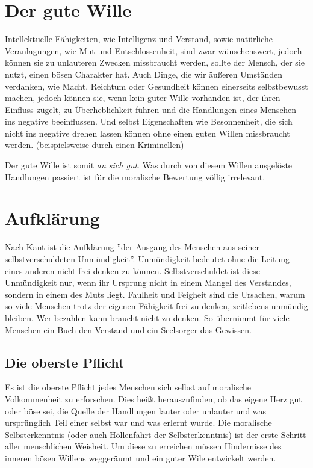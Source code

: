 \documentclass{article}
\begin{document}
\section*{Der gute Wille}
Intellektuelle Fähigkeiten, wie Intelligenz und Verstand, sowie natürliche Veranlagungen, wie Mut und Entschlossenheit,
sind zwar wünschenswert, jedoch können sie zu unlauteren Zwecken missbraucht werden, sollte der Mensch, der sie nutzt,
einen bösen Charakter hat. Auch Dinge, die wir äußeren Umständen verdanken, wie Macht, Reichtum oder Gesundheit können 
einerseits selbstbewusst machen, jedoch können sie, wenn kein guter Wille vorhanden ist, der ihren Einfluss zügelt, zu
Überheblichkeit führen und die Handlungen eines Menschen ins negative beeinflussen. Und selbst Eigenschaften wie Besonnenheit,
die sich nicht ins negative drehen lassen können ohne einen guten Willen missbraucht werden. (beispielsweise durch einen
Kriminellen)

Der gute Wille ist somit \emph{an sich gut}. Was durch von diesem Willen ausgelöste Handlungen passiert ist für die moralische 
Bewertung völlig irrelevant.

\section*{Aufklärung}
Nach Kant ist die Aufklärung ''der Ausgang des Menschen aus seiner selbstverschuldeten Unmündigkeit''. Unmündigkeit bedeutet
ohne die Leitung eines anderen nicht frei denken zu können. Selbstverschuldet ist diese Unmündigkeit nur, wenn ihr Ursprung
nicht in einem Mangel des Verstandes, sondern in einem des Muts liegt. Faulheit und Feigheit sind die Ursachen, warum so viele
Menschen trotz der eigenen Fähigkeit frei zu denken, zeitlebens unmündig bleiben. Wer bezahlen kann braucht nicht zu denken.
So übernimmt für viele Menschen ein Buch den Verstand und ein Seelsorger das Gewissen.

\subsection*{Die oberste Pflicht}
Es ist die oberste Pflicht jedes Menschen sich selbst auf moralische Volkommenheit zu erforschen. Dies heißt herauszufinden,
ob das eigene Herz gut oder böse sei, die Quelle der Handlungen lauter oder unlauter und was ursprünglich Teil einer selbst 
war und was erlernt wurde.
Die moralische Selbsterkenntnis (oder auch Höllenfahrt der Selbsterkenntnis) ist der erste Schritt aller menschlichen Weisheit.
Um diese zu erreichen müssen Hindernisse des inneren bösen Willens weggeräumt und ein guter Wile entwickelt werden.
\end{document}
